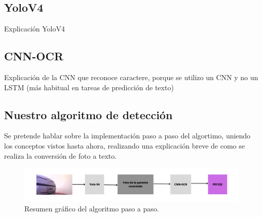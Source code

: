\subsection{YoloV4}

Explicación YoloV4

\subsection{CNN-OCR}

Explicación de la CNN que reconoce caractere, porque se utilizo un CNN y no un LSTM (más habitual en tareas de predicción de texto)


\subsection{Nuestro algoritmo de detección}

Se pretende hablar sobre la implementación paso a paso del algortimo, uniendo los conceptos vistos hasta ahora, realizando una explicación breve de como se realiza la conversión de foto a texto.

\begin{figure}
    \centering
    \includegraphics{imgs/algoritmo-deteccion-patente.png}
    \caption{Resumen gráfico del algoritmo paso a paso.}
\end{figure}